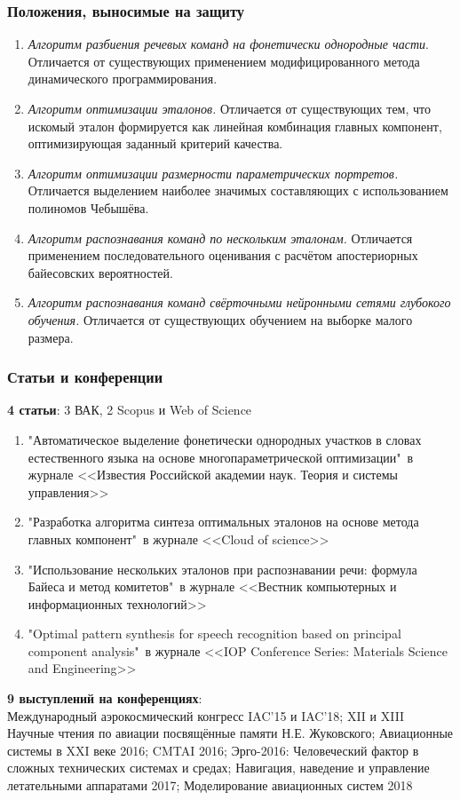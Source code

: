 \begin{frame}
\frametitle{Положения, выносимые на защиту}
\vfill
\begin{enumerate}
	\footnotesize
	\item \textit{Алгоритм разбиения речевых команд на фонетически однородные части}.
	Отличается от существующих применением модифицированного метода динамического программирования.
	\item \textit{Алгоритм оптимизации эталонов.}
	Отличается от существующих тем, что искомый эталон формируется как линейная комбинация главных компонент, оптимизирующая заданный критерий качества.
	\item \textit{Алгоритм оптимизации размерности параметрических портретов.}
	Отличается выделением наиболее значимых составляющих с использованием полиномов Чебышёва.
	\item \textit{Алгоритм распознавания команд по нескольким эталонам.}
	Отличается применением последовательного оценивания с расчётом апостериорных байесовских вероятностей.
	\item \textit{Алгоритм распознавания команд свёрточными нейронными сетями глубокого обучения.}
	Отличается от существующих обучением на выборке малого размера.
\end{enumerate}
\vfill
\end{frame}

\begin{frame}
\frametitle{Статьи и конференции}
\footnotesize
\vfill
\textbf{4 статьи}: 3 ВАК, 2 Scopus и Web of Science
\begin{enumerate}
	\scriptsize
	\item "Автоматическое выделение фонетически однородных участков в словах естественного языка на основе многопараметрической оптимизации"\
	в журнале
	<<Известия Российской академии наук. Теория и системы управления>>
	\item "Разработка алгоритма синтеза оптимальных эталонов на основе метода главных компонент"\
	в журнале
	<<Cloud of science>>
	\item "Использование нескольких эталонов при распознавании речи: формула Байеса и метод комитетов"\
	в журнале
	<<Вестник компьютерных и информационных технологий>>
	\item "Optimal pattern synthesis for speech recognition based on principal component analysis"\
	в журнале
	<<IOP Conference Series: Materials Science and Engineering>>
\end{enumerate}
\vfill
\textbf{9 выступлений на конференциях}: \\
Международный аэрокосмический конгресс IAC'15 и IAC'18;
XII и XIII Научные чтения по авиации посвящённые памяти Н.Е. Жуковского;
Авиационные системы в XXI веке 2016;
CMTAI 2016;
Эрго-2016: Человеческий фактор в сложных технических системах и средах;
Навигация, наведение и управление летательными аппаратами 2017;
Моделирование авиационных систем 2018
\vfill
\end{frame}


